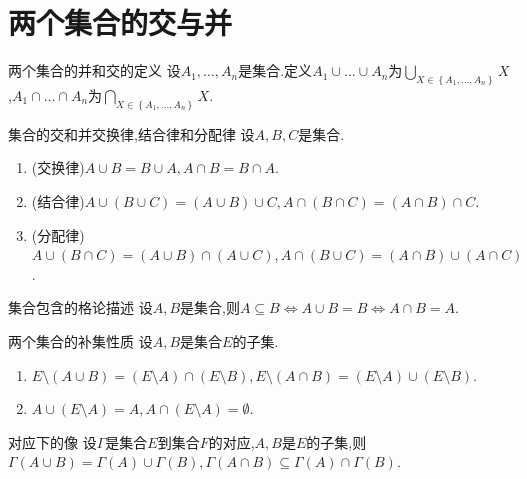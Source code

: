 \section{两个集合的交与并}

\begin{definition}{两个集合的并和交的定义}{}
	设$A_{1},\ldots,A_{n}$是集合.定义$A_{1}\cup\ldots\cup A_{n}$为$\bigcup\limits_{X\in\left\{A_{1},\ldots,A_{n}\right\}}X$,$A_{1}\cap\ldots\cap A_{n}$为$\bigcap\limits_{X\in\left\{A_{1},\ldots,A_{n}\right\}}X$.
\end{definition}

\begin{proposition}{集合的交和并交换律,结合律和分配律}{}
	设$A,B,C$是集合.
	\begin{enumerate}
		\item (交换律)$A\cup B=B\cup A,A\cap B=B\cap A$.
		\item (结合律)$A\cup\left(B\cup C\right)=\left(A\cup B\right)\cup C,A\cap\left(B\cap C\right)=\left(A\cap B\right)\cap C$.
		\item (分配律)$A\cup\left(B\cap C\right)=\left(A\cup B\right)\cap\left(A\cup C\right),A\cap\left(B\cup C\right)=\left(A\cap B\right)\cup\left(A\cap C\right)$.
	\end{enumerate}
\end{proposition}

\begin{proposition}{集合包含的格论描述}{}
	设$A,B$是集合,则$A\subseteq B\iff A\cup B=B\iff A\cap B=A$.
\end{proposition}

\begin{proposition}{两个集合的补集性质}{}
	设$A,B$是集合$E$的子集.
	\begin{enumerate}
		\item $E\setminus\left(A\cup B\right)=\left(E\setminus A\right)\cap\left(E\setminus B\right),E\setminus\left(A\cap B\right)=\left(E\setminus A\right)\cup\left(E\setminus B\right)$.
		\item $A\cup\left(E\setminus A\right)=A,A\cap\left(E\setminus A\right)=\emptyset$.
	\end{enumerate}
\end{proposition}

\begin{proposition}{对应下的像}{}
	设$\Gamma$是集合$E$到集合$F$的对应,$A,B$是$E$的子集,则$\Gamma\left(A\cup B\right)=\Gamma\left(A\right)\cup\Gamma\left(B\right),\Gamma\left(A\cap B\right)\subseteq\Gamma\left(A\right)\cap\Gamma\left(B\right)$.
\end{proposition}

